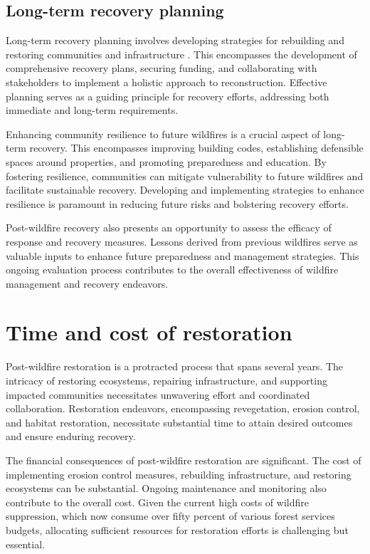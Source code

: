 \documentclass[
  12 pt,
]{Nemilov}
\begin{document}
\subsection{Long-term recovery planning}\label{long-term-recovery-planning}

Long-term recovery planning involves developing strategies for rebuilding and restoring communities and infrastructure \citep{bates1989long, shaw2014post}. This encompasses the development of comprehensive recovery plans, securing funding, and collaborating with stakeholders to implement a holistic approach to reconstruction. Effective planning serves as a guiding principle for recovery efforts, addressing both immediate and long-term requirements.

Enhancing community resilience to future wildfires is a crucial aspect of long-term recovery. This encompasses improving building codes, establishing defensible spaces around properties, and promoting preparedness and education. By fostering resilience, communities can mitigate vulnerability to future wildfires and facilitate sustainable recovery. Developing and implementing strategies to enhance resilience is paramount in reducing future risks and bolstering recovery efforts.

Post-wildfire recovery also presents an opportunity to assess the efficacy of response and recovery measures. Lessons derived from previous wildfires serve as valuable inputs to enhance future preparedness and management strategies. This ongoing evaluation process contributes to the overall effectiveness of wildfire management and recovery endeavors.

\section{Time and cost of restoration}\label{time-and-cost-of-restoration}

Post-wildfire restoration is a protracted process that spans several years. The intricacy of restoring ecosystems, repairing infrastructure, and supporting impacted communities necessitates unwavering effort and coordinated collaboration. Restoration endeavors, encompassing revegetation, erosion control, and habitat restoration, necessitate substantial time to attain desired outcomes and ensure enduring recovery.

The financial consequences of post-wildfire restoration are significant. The cost of implementing erosion control measures, rebuilding infrastructure, and restoring ecosystems can be substantial. Ongoing maintenance and monitoring also contribute to the overall cost. Given the current high costs of wildfire suppression, which now consume over fifty percent of various forest services budgets, allocating sufficient resources for restoration efforts is challenging but essential.
\end{document}
